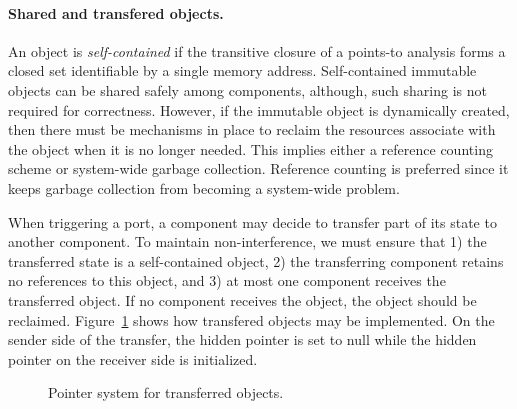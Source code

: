 \paragraph{Shared and transfered objects.}
An object is \emph{self-contained} if the transitive closure of a points-to analysis forms a closed set identifiable by a single memory address.
Self-contained immutable objects can be shared safely among components, although, such sharing is not required for correctness.
However, if the immutable object is dynamically created, then there must be mechanisms in place to reclaim the resources associate with the object when it is no longer needed.
This implies either a reference counting scheme or system-wide garbage collection.
Reference counting is preferred since it keeps garbage collection from becoming a system-wide problem.

When triggering a port, a component may decide to transfer part of its state to another component.
To maintain non-interference, we must ensure that 1) the transferred state is a self-contained object, 2) the transferring component retains no references to this object, and 3) at most one component receives the transferred object.
If no component receives the object, the object should be reclaimed.
Figure~\ref{pointer} shows how transfered objects may be implemented.
On the sender side of the transfer, the hidden pointer is set to null while the hidden pointer on the receiver side is initialized.

\begin{figure}
{

\centerline{\box\graph}
}
\caption{Pointer system for transferred objects.\label{pointer}}
\end{figure}
